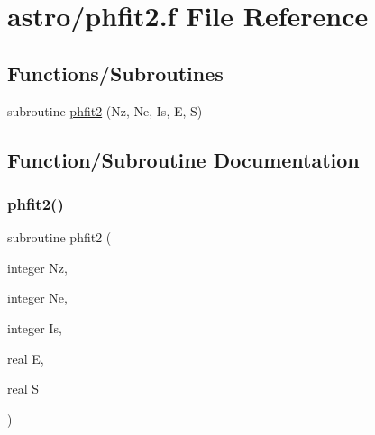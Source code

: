 \hypertarget{phfit2_8f}{}\section{astro/phfit2.f File Reference}
\label{phfit2_8f}
\subsection*{Functions/\+Subroutines}
\begin{DoxyCompactItemize}
\item 
subroutine \hyperlink{phfit2_8f_abfe7bc2ef2b38acf9a39b12edc4ac94f}{phfit2} (Nz, Ne, Is, E, S)
\end{DoxyCompactItemize}


\subsection{Function/\+Subroutine Documentation}
\mbox{\label{phfit2_8f_abfe7bc2ef2b38acf9a39b12edc4ac94f}} 
\subsubsection{\texorpdfstring{phfit2()}{phfit2()}}
{\footnotesize\ttfamily subroutine phfit2 (\begin{DoxyParamCaption}\item[{integer}]{Nz,  }\item[{integer}]{Ne,  }\item[{integer}]{Is,  }\item[{real}]{E,  }\item[{real}]{S }\end{DoxyParamCaption})}

